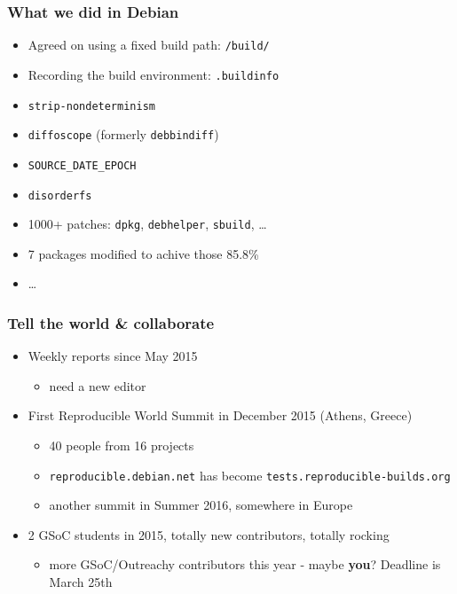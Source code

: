 \documentclass[14pt]{beamer}
\begin{document}
\begin{frame}
 \frametitle{What we did in Debian}

 \begin{itemize}
  \item Agreed on using a fixed build path: \texttt{/build/}
  \item Recording the build environment: \texttt{.buildinfo}
  \item \texttt{strip-nondeterminism}
  \item \texttt{diffoscope} (formerly \texttt{debbindiff})
  \item \texttt{SOURCE\_DATE\_EPOCH}
  \item \texttt{disorderfs}
  \item 1000+ patches: \texttt{dpkg}, \texttt{debhelper}, \texttt{sbuild}, …
  \item 7 packages modified to achive those 85.8\%
  \item …
 \end{itemize}
\end{frame}


\begin{frame}
 \frametitle{Tell the world \& collaborate}

 \begin{itemize}
  \item Weekly reports since May 2015
   \begin{itemize}
    \item need a new editor
   \end{itemize}
  \item<2-4> First Reproducible World Summit in December 2015 (Athens, Greece)
   \begin{itemize}
    \item<2-4> 40 people from 16 projects
    \item<2-4> \texttt{reproducible.debian.net} has become
  \texttt{tests.reproducible-builds.org}
  \item<3-4> another summit in Summer 2016, somewhere in Europe
   \end{itemize}
  \item<4> 2 GSoC students in 2015, totally new contributors, totally rocking
  \begin{itemize}
 \item<4> more GSoC/Outreachy contributors this year - maybe \textbf{you}? Deadline is
 March 25th
   \end{itemize}
 \end{itemize}
\end{frame}
\end{document}
